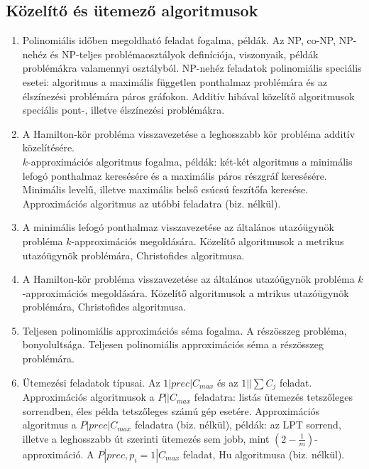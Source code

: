 \subsection*{Közelítő és ütemező algoritmusok}
\begin{enumerate}[resume]
\item	Polinomiális időben megoldható feladat fogalma, példák. Az NP, co-NP, NP-nehéz és NP-teljes problémaosztályok definíciója, viszonyaik, példák problémákra valamennyi osztályból. NP-nehéz feladatok polinomiális speciális esetei: algoritmus a maximális független ponthalmaz problémára és az élszínezési problémára páros gráfokon. Additív hibával közelítő algoritmusok speciális pont-, illetve élszínezési problémákra.
\item	A Hamilton-kör probléma visszavezetése a leghosszabb kör probléma additív közelítésére.\\ $k$-approximációs algoritmus fogalma, példák: két-két algoritmus a minimális lefogó ponthalmaz keresésére és a maximális páros részgráf keresésére. Minimális levelű, illetve maximális belső csúcsú feszítőfa keresése. Approximációs algoritmus az utóbbi feladatra (biz. nélkül).
\item	A minimális lefogó ponthalmaz visszavezetése az általános utazóügynök probléma $k$-approximációs megoldására. Közelítő algoritmusok a metrikus utazóügynök problémára, Christofides algoritmusa.
\item	A Hamilton-kör probléma visszavezetése az általános utazóügynök probléma $k$-approximációs megoldására. Közelítő algoritmusok a mtrikus utazóügynök problémára, Christofides algoritmusa.
\item	Teljesen polinomiális approximációs séma fogalma. A részösszeg probléma, bonyolultsága. Teljesen polinomiális approximációs séma a részösszeg problémára.
\item	Ütemezési feladatok típusai. Az $1|prec|C_{max}$ és az $1||\sum C_{j}$ feladat. Approximációs algoritmusok a $P||C_{max}$ feladatra: listás ütemezés tetszőleges sorrendben, éles példa tetszőleges számú gép esetére. Approximációs algoritmus a $P|prec|C_{max}$ feladatra (biz. nélkül), példák: az LPT sorrend, illetve a leghosszabb út szerinti ütemezés sem jobb, mint $(2-\frac {1} {m})$-approximáció. A $P|prec,p_{i}=1|C_{max}$ feladat, Hu algoritmusa (biz. nélkül).
\end{enumerate}

\vspace{3mm}
